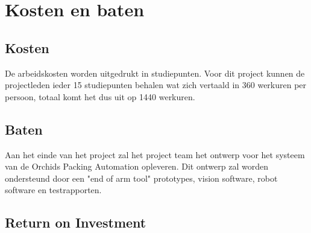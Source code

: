 
\section{Kosten en baten}
 
\subsection*{Kosten}
De arbeidskosten worden uitgedrukt in studiepunten. Voor dit project kunnen de projectleden ieder 15 studiepunten behalen wat zich vertaald in 360 werkuren per persoon, totaal komt het dus uit op 1440 werkuren.

\subsection*{Baten}
Aan het einde van het project zal het project team het ontwerp voor het systeem van de Orchids Packing Automation opleveren. Dit ontwerp zal worden ondersteund door een "end of arm tool" prototypes, vision software, robot software en testrapporten. 

\subsection*{Return on Investment}

\newpage
